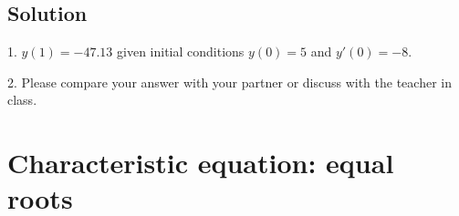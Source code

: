 \subsection*{Solution}
1. $y(1) = -47.13$ given initial conditions $y(0)=5$ and $y'(0)=-8$.

2. Please compare your answer with your partner or discuss with the teacher in class.



%
%
%
%
%
%
%
%
%
%
%




\newpage
\section{Characteristic equation: equal roots}

